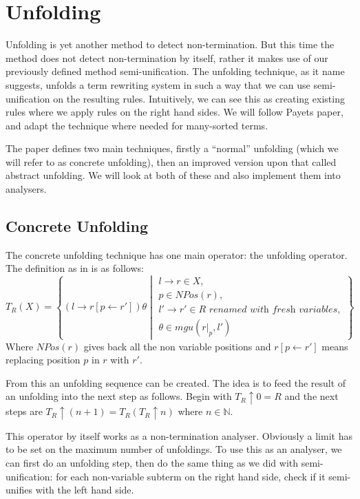 \chapter{Unfolding}\label{unfolding}
Unfolding is yet another method to detect non-termination. But this time the method does not detect non-termination by itself, rather it makes use of our previously defined method semi-unification. The unfolding technique, as it name suggests, unfolds a term rewriting system in such a way that we can use semi-unification on the resulting rules. Intuitively, we can see this as creating existing rules where we apply rules on the right hand sides. We will follow Payets paper\cite{Payet:Unfolding}, and adapt the technique where needed for many-sorted terms. 

The paper defines two main techniques, firstly a ``normal'' unfolding (which we will refer to as concrete unfolding), then an improved version upon that called abstract unfolding. We will look at both of these and also implement them into analysers. 

\section{Concrete Unfolding}
The concrete unfolding technique has one main operator: the unfolding operator. The definition as in \cite{Payet:Unfolding} is as follows:
\[
T_R(X) = \left\{ \left( l \rightarrow r\left[ p \leftarrow r' \right] \right)\theta \middle\vert \begin{array}{l} 
l \rightarrow r \in X, \\
p \in \textit{NPos}(r), \\
l' \rightarrow r' \in R \textit{ renamed with fresh variables}, \\
\theta \in mgu(\left.r\right|_p, l')
\end{array}
\right\} 
\]
Where $\textit{NPos}(r)$ gives back all the non variable positions and $r\left[ p \leftarrow r'\right]$ means replacing position $p$ in $r$ with $r'$. 

From this an unfolding sequence can be created. The idea is to feed the result of an unfolding into the next step as follows. Begin with $T_R \uparrow 0 = R$ and the next steps are $T_R \uparrow (n + 1) = T_R(T_R \uparrow n)$ where $n \in \mathbb{N}$. 

This operator by itself works as a non-termination analyser. Obviously a limit has to be set on the maximum number of unfoldings. To use this as an analyser, we can first do an unfolding step, then do the same thing as we did with semi-unification: for each non-variable subterm on the right hand side, check if it semi-unifies with the left hand side. 

